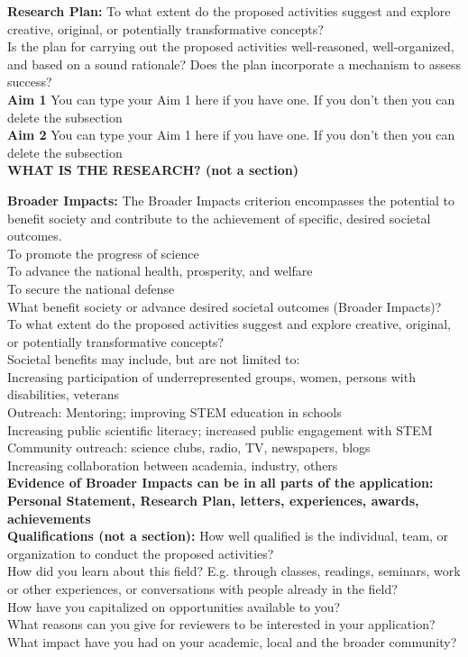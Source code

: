 \documentclass[12pt]{article}
\begin{document}
\noindent
\textbf{Research Plan:} To what extent do the proposed activities suggest and explore creative, original, or potentially transformative concepts?\\
Is the plan for carrying out the proposed activities well-reasoned, well-organized, and based on a sound rationale? Does the plan incorporate a mechanism to assess success?\\
\textbf{Aim 1} You can type your Aim 1 here if you have one. If you don't then you can delete the subsection\\
\textbf{Aim 2} You can type your Aim 1 here if you have one. If you don't then you can delete the subsection\\

\noindent
\textbf{WHAT IS THE RESEARCH? (not a section)}

\noindent
\textbf{Broader Impacts:} The Broader Impacts criterion encompasses the potential to benefit society and contribute to the achievement of specific, desired societal outcomes.\\
To promote the progress of science\\
To advance the national health, prosperity, and welfare\\
To secure the national defense\\
What benefit society or advance desired societal outcomes (Broader Impacts)?\\
To what extent do the proposed activities suggest and explore creative, original, or potentially transformative concepts?\\
Societal benefits may include, but are not limited to:\\
Increasing participation of underrepresented groups, women, persons with disabilities, veterans\\
Outreach: Mentoring; improving STEM education in schools\\
Increasing public scientific literacy; increased public engagement with STEM\\
Community outreach: science clubs, radio, TV, newspapers, blogs\\
Increasing collaboration between academia, industry, others\\

\noindent
\textbf{Evidence of Broader Impacts can be in all parts of the application: Personal Statement, Research Plan, letters, experiences, awards, achievements}\\

\noindent
\textbf{Qualifications (not a section):} How well qualified is the individual, team, or organization to conduct the proposed activities? \\
How did you learn about this field? E.g. through classes, readings, seminars, work or other experiences, or conversations with people already in the field?\\
How have you capitalized on opportunities available to you?\\
What reasons can you give for reviewers to be interested in your application?\\
What impact have you had on your academic, local and the broader community?\\
\end{document}
